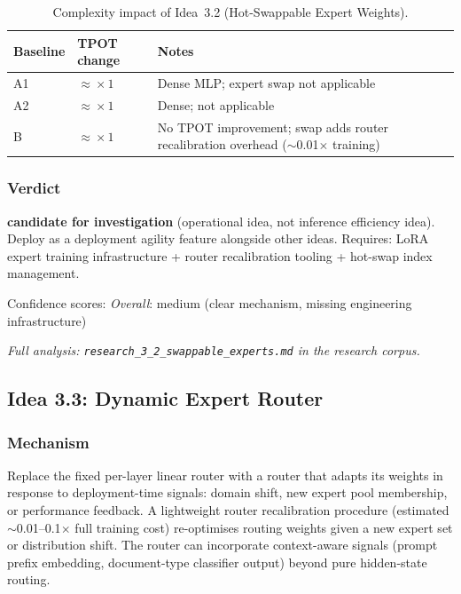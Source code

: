 \documentclass[11pt]{article}
\begin{document}
\begin{table}[h]
\centering
\caption{Complexity impact of Idea~3.2 (Hot-Swappable Expert Weights).}
\label{tab:complexity-3-2}
\begin{tabular}{llp{7cm}}
\toprule
\textbf{Baseline} & \textbf{TPOT change} & \textbf{Notes} \\
\midrule
A1 & $\approx\!\times 1$ & Dense MLP; expert swap not applicable \\
A2 & $\approx\!\times 1$ & Dense; not applicable \\
B  & $\approx\!\times 1$ & No TPOT improvement; swap adds router recalibration overhead ($\sim$0.01$\times$ training) \\
\bottomrule
\end{tabular}
\end{table}

\subsubsection*{Verdict}
\textbf{candidate for investigation} (operational idea, not inference efficiency idea).
Deploy as a deployment agility feature alongside other ideas.
Requires: LoRA expert training infrastructure + router recalibration tooling + hot-swap index management.

\noindent
Confidence scores:
\emph{Overall}: medium (clear mechanism, missing engineering infrastructure)

\par\noindent\textit{Full analysis: \texttt{research\_3\_2\_swappable\_experts.md} in the research corpus.}

\subsection{Idea 3.3: Dynamic Expert Router}
\label{subsec:idea-3-3}

\subsubsection*{Mechanism}
Replace the fixed per-layer linear router with a router that adapts its weights in response to deployment-time signals: domain shift, new expert pool membership, or performance feedback.
A lightweight router recalibration procedure (estimated $\sim$0.01--0.1$\times$ full training cost) re-optimises routing weights given a new expert set or distribution shift.
The router can incorporate context-aware signals (prompt prefix embedding, document-type classifier output) beyond pure hidden-state routing.
\end{document}
